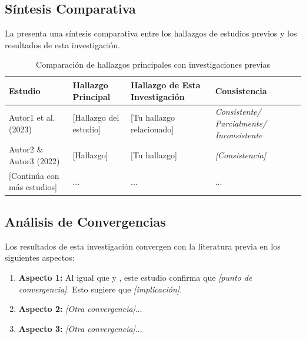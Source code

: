 \subsection{Síntesis Comparativa}
\label{subsec:sintesis_comparativa}

La  presenta una síntesis comparativa entre los hallazgos de estudios previos y los resultados de esta investigación.

\begin{table}[htbp]
    \centering
    \caption{Comparación de hallazgos principales con investigaciones previas}
    \label{tab:sintesis_discusion}
    \small
    \begin{tabular}{@{}p{3cm}p{4cm}p{4cm}p{3cm}@{}}
        \toprule
        \textbf{Estudio} & \textbf{Hallazgo Principal} & \textbf{Hallazgo de Esta Investigación} & \textbf{Consistencia} \\
        \midrule
        
        Autor1 et al. (2023) & 
        {[Hallazgo del estudio]} & 
        {[Tu hallazgo relacionado]} & 
        \textit{Consistente/ Parcialmente/ Inconsistente} \\
        \midrule
        
        Autor2 \& Autor3 (2022) & 
        {[Hallazgo]} & 
        {[Tu hallazgo]} & 
        \textit{{[Consistencia]}} \\
        \midrule
        
        {[Continúa con más estudios]} & 
        ... & 
        ... & 
        ... \\
        
        \bottomrule
    \end{tabular}
\end{table}

\subsection{Análisis de Convergencias}
\label{subsec:convergencias}

Los resultados de esta investigación convergen con la literatura previa en los siguientes aspectos:

\begin{enumerate}
    \item \textbf{Aspecto 1:} Al igual que \cite{autor1} y \cite{autor2}, este estudio confirma que \textit{{[punto de convergencia]}}. Esto sugiere que \textit{{[implicación]}}.
    
    \item \textbf{Aspecto 2:} \textit{{[Otra convergencia]}}...
    
    \item \textbf{Aspecto 3:} \textit{{[Otra convergencia]}}...
\end{enumerate}

